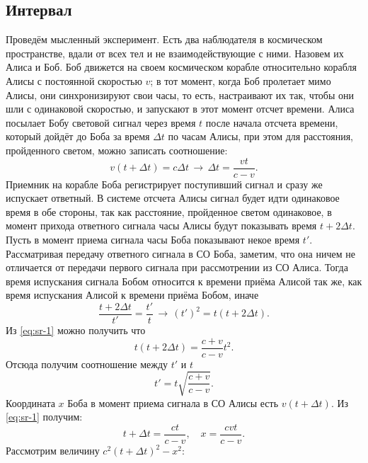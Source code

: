 \subsection{Интервал}
Проведём мысленный эксперимент. Есть два наблюдателя в космическом пространстве, вдали от всех тел и не взаимодействующие с ними. Назовем их Алиса и Боб. Боб движется на своем космическом корабле относительно корабля Алисы с постоянной скоростью $v$; в тот момент, когда Боб пролетает мимо Алисы, они синхронизируют свои часы, то есть, настраивают их так, чтобы они шли с одинаковой скоростью, и запускают в этот момент отсчет времени. Алиса посылает Бобу световой сигнал через время $t$ после начала отсчета времени, который дойдёт до Боба за время $\Delta t$ по часам Алисы, при этом для расстояния, пройденного светом, можно записать соотношение: 
 \begin{equation}
 	v(t + \Delta t) = c \Delta t \,\rightarrow\, \Delta t = \frac{vt}{c-v}.
 \label{eq:sr-1}
 \end{equation}
 Приемник на корабле Боба регистрирует поступивший сигнал и сразу же испускает ответный. В системе отсчета Алисы сигнал будет идти одинаковое время в обе стороны, так как расстояние, пройденное светом одинаковое, в момент прихода ответного сигнала часы Алисы будут показывать время $t+2\Delta t$. Пусть в момент приема сигнала часы Боба показывают некое время $t'$. Рассматривая передачу ответного сигнала в СО Боба, заметим, что она ничем не отличается от передачи первого сигнала при рассмотрении из СО Алиса. Тогда время испускания сигнала Бобом относится к времени приёма Алисой так же, как время испускания Алисой к времени приёма Бобом, иначе
 \begin{equation}
 	\frac{t+2\Delta t}{t'}=\frac{t'}{t} \,\rightarrow\, (t')^2 = t(t+2\Delta t).
 	 \label{eq:sr-2}
 \end{equation}
 Из \eqref{eq:sr-1} можно получить что
\begin{equation*}
	t(t+2\Delta t)=\frac{c+v}{c-v}t^2.
\end{equation*}
Отсюда получим соотношение между $t'$ и $t$
\begin{equation*}
	t' = t \sqrt{\frac{c+v}{c-v}}.
\end{equation*}
Координата $x$ Боба в момент приема сигнала в СО Алисы есть $v(t+\Delta t)$. Из \eqref{eq:sr-1} получим:
\begin{equation*}
	t + \Delta t = \frac{ct}{c-v}, \quad x = \frac{cvt}{c-v}.
\end{equation*}
Рассмотрим величину $c^2(t+\Delta t)^2-x^2$:
